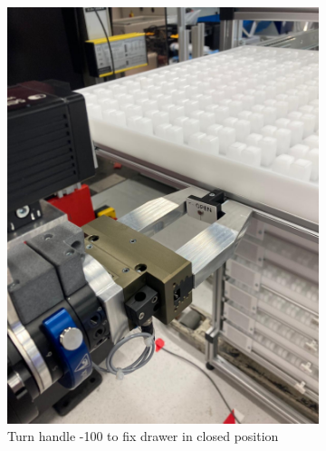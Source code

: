 \begin{figure}[h]
\begin{subfigure}[b]{0.32\textwidth}
        \includegraphics[width=\textwidth]{figures/shelf-control/close-handle.jpeg}
        \caption{Turn handle -100\textdegree{} to fix drawer in closed position}
        \label{fig:close-handle}
    \end{subfigure}\hspace{0.1cm}
    \begin{subfigure}[b]{0.32\textwidth}
        \centering

\end{subfigure}
\end{figure}
